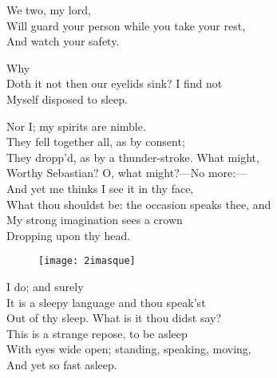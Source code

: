 \begin{verse_speech}[Antonio] 
We two, my lord,\\
Will guard your person while you take your rest,\\
And watch your safety.
\end{verse_speech}


\begin{verse_speech}[Sebastian] 
Why\\
Doth it not then our eyelids sink? I find not\\
Myself disposed to sleep.
\end{verse_speech}

\begin{verse_speech}[Antonio] 
Nor I; my spirits are nimble.\\
They fell together all, as by consent;\\
They dropp'd, as by a thunder-stroke. What might,\\
Worthy Sebastian? O, what might?—No more:—\\
And yet me thinks I see it in thy face,\\
What thou shouldst be: the occasion speaks thee, and\\
My strong imagination sees a crown\\
Dropping upon thy head.
\end{verse_speech}

\begin{figure}[tb]
\centering
\texttt{[image: 2imasque]}
\end{figure}

\begin{verse_speech}[Sebastian] 
I do; and surely\\
It is a sleepy language and thou speak'st\\
Out of thy sleep. What is it thou didst say?\\
This is a strange repose, to be asleep\\
With eyes wide open; standing, speaking, moving,\\
And yet so fast asleep.
\end{verse_speech}

